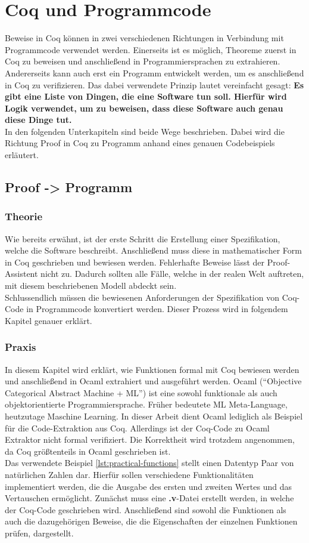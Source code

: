 \section{Coq und Programmcode}
\label{s:coq-and-code}
Beweise in Coq können in zwei verschiedenen Richtungen in Verbindung mit Programmcode verwendet werden. Einerseits ist es möglich, Theoreme zuerst in Coq zu beweisen und anschließend in Programmiersprachen zu extrahieren. Andererseits kann auch erst ein Programm entwickelt werden, um es anschließend in Coq zu verifizieren. Das dabei verwendete Prinzip lautet vereinfacht gesagt:
\textbf{Es gibt eine Liste von Dingen, die eine Software tun soll. Hierfür wird Logik verwendet, um zu beweisen, dass diese Software auch genau diese Dinge tut.}
\\
In den folgenden Unterkapiteln sind beide Wege beschrieben. Dabei wird die Richtung Proof in Coq zu Programm anhand eines genauen Codebeispiels erläutert.


\subsection{Proof -> Programm}
\subsubsection{Theorie}
{Wie bereits erwähnt, ist der erste Schritt die Erstellung einer Spezifikation, welche die Software beschreibt. Anschließend muss diese in mathematischer Form in Coq geschrieben und bewiesen werden. Fehlerhafte Beweise lässt der Proof-Assistent nicht zu.
Dadurch sollten alle Fälle, welche in der realen Welt auftreten, mit diesem beschriebenen Modell abdeckt sein.\\
Schlussendlich müssen die bewiesenen Anforderungen der Spezifikation von Coq-Code in Programmcode konvertiert werden. Dieser Prozess wird in folgendem Kapitel genauer erklärt.}\cite{HELWER01:FV}

\subsubsection{Praxis}
In diesem Kapitel wird erklärt, wie Funktionen formal mit Coq bewiesen werden und anschließend in Ocaml extrahiert und ausgeführt werden. Ocaml ("`Objective Categorical Abstract Machine + ML"') ist eine sowohl funktionale als auch objektorientierte Programmiersprache. Früher bedeutete ML Meta-Language, heutzutage Maschine Learning. In dieser Arbeit dient Ocaml lediglich als Beispiel für die Code-Extraktion aus Coq. Allerdings ist der Coq-Code zu Ocaml Extraktor nicht formal verifiziert. Die Korrektheit wird trotzdem angenommen, da Coq größtenteils in Ocaml geschrieben ist.\\
Das verwendete Beispiel \ref{lst:practical-functions} stellt einen Datentyp Paar von natürlichen Zahlen dar. Hierfür sollen verschiedene Funktionalitäten implementiert werden, die die Ausgabe des ersten und zweiten Wertes und das Vertauschen ermöglicht.
Zunächst muss eine \textbf{.v}-Datei erstellt werden, in welche der Coq-Code geschrieben wird. Anschließend sind sowohl die Funktionen als auch die dazugehörigen Beweise, die die Eigenschaften der einzelnen Funktionen prüfen, dargestellt.

